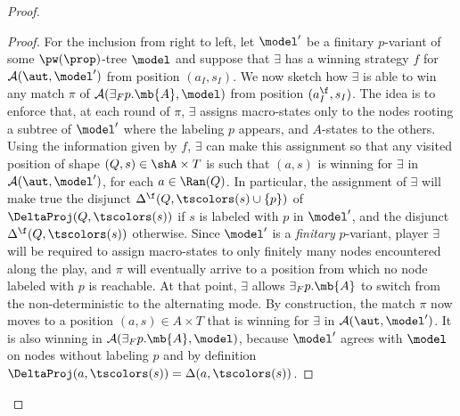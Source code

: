 \begin{proof}
\begin{proof}
For the inclusion from right to left, let $\model'$ be a finitary $p$-variant of some ${\pw (\prop)}$-tree $\model$ and suppose that $\exists$ has a winning strategy $f$ for $\mathcal{A}(\aut,\model')$ from position $(a_I,s_I)$. We now sketch how $\exists$ is able to win any match $\pi$ of $\mathcal{A}({{\exists}_F p}.\mb{A},\model)$ from position $(a_I^{\f},s_I)$. The idea is to enforce that, at each round of $\pi$, $\exists$ assigns macro-states only to the nodes rooting a subtree of $\model'$ where the labeling $p$ appears, and $A$-states to the others. Using the information given by $f$, $\exists$ can make this assignment so that any visited position of shape $(Q,s) \in \shA \times T$ is such that $(a,s)$ is winning for $\exists$ in $\mathcal{A}(\aut,\model')$, for each $a \in \Ran(Q)$. In particular, the assignment of $\exists$ will make true the disjunct $\Delta^{\f}(Q,\tscolors(s)\cup\{p\})$ of $\DeltaProj(Q,\tscolors(s))$ if $s$ is labeled with $p$ in $\model'$, and the disjunct $\Delta^{\f}(Q,\tscolors(s))$ otherwise. Since $\model'$ is a \emph{finitary} $p$-variant, player $\exists$ will be required to assign macro-states to only finitely many nodes encountered along the play, and $\pi$ will eventually arrive to a position from which no node labeled with $p$ is reachable. At that point, $\exists$ allows ${{\exists}_F p}.\mb{A}$ to switch from the non-deterministic to the alternating mode. By construction, the match $\pi$ now moves to a position $(a,s) \in A \times T$ that is winning for $\exists$ in $\mathcal{A}(\aut,\model')$. It is also winning in $\mathcal{A}({{\exists}_F p}.\mb{A},\model)$, because $\model'$ agrees with $\model$ on nodes without labeling $p$ and by definition $\DeltaProj(a,\tscolors(s)) = \Delta(a,\tscolors(s))$. %
\end{proof}


\end{proof}
